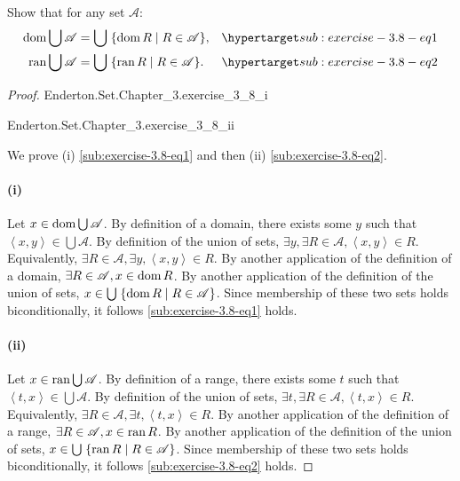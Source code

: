 \documentclass{report}
\newcommand{\pair}[1]{\left< #1 \right>}
\begin{document}
Show that for any set $\mathscr{A}$:
  \begin{align}
    \dom{\bigcup{\mathscr{A}}}
      & = \bigcup\;\{ \dom{R} \mid R \in \mathscr{A} \},
      & \hyperlabel{sub:exercise-3.8-eq1} \\
    \ran{\bigcup{\mathscr{A}}}
      & = \bigcup\;\{ \ran{R} \mid R \in \mathscr{A} \}.
      & \hyperlabel{sub:exercise-3.8-eq2}
  \end{align}

\begin{proof}

  \statementpadding

    {Enderton.Set.Chapter\_3.exercise\_3\_8\_i}

    {Enderton.Set.Chapter\_3.exercise\_3\_8\_ii}

  We prove (i) \eqref{sub:exercise-3.8-eq1} and then (ii)
    \eqref{sub:exercise-3.8-eq2}.

  \paragraph{(i)}%

    Let $x \in \mathop{\text{dom}}{\bigcup{\mathscr{A}}}$.
    By definition of a domain, there exists some $y$ such that
      $\pair{x, y} \in \bigcup{\mathscr{A}}$.
    By definition of the union of sets,
      $\exists y, \exists R \in \mathscr{A}, \pair{x, y} \in R$.
    Equivalently,
      $\exists R \in \mathscr{A}, \exists y, \pair{x, y} \in R$.
    By another application of the definition of a domain,
      $\exists R \in \mathscr{A}, x \in \mathop{\text{dom}}{R}$.
    By another application of the definition of the union of sets,
      $x \in \bigcup\;\{ \mathop{\text{dom}}{R} \mid R \in \mathscr{A} \}$.
    Since membership of these two sets holds biconditionally, it follows
      \eqref{sub:exercise-3.8-eq1} holds.

  \paragraph{(ii)}%

    Let $x \in \mathop{\text{ran}}{\bigcup{\mathscr{A}}}$.
    By definition of a range, there exists some $t$ such that
      $\pair{t, x} \in \bigcup{\mathscr{A}}$.
    By definition of the union of sets,
      $\exists t, \exists R \in \mathscr{A}, \pair{t, x} \in R$.
    Equivalently,
      $\exists R \in \mathscr{A}, \exists t, \pair{t, x} \in R$.
    By another application of the definition of a range,
      $\exists R \in \mathscr{A}, x \in \mathop{\text{ran}}{R}$.
    By another application of the definition of the union of sets,
      $x \in \bigcup\;\{ \mathop{\text{ran}}{R} \mid R \in \mathscr{A} \}$.
    Since membership of these two sets holds biconditionally, it follows
      \eqref{sub:exercise-3.8-eq2} holds.

\end{proof}
\end{document}
